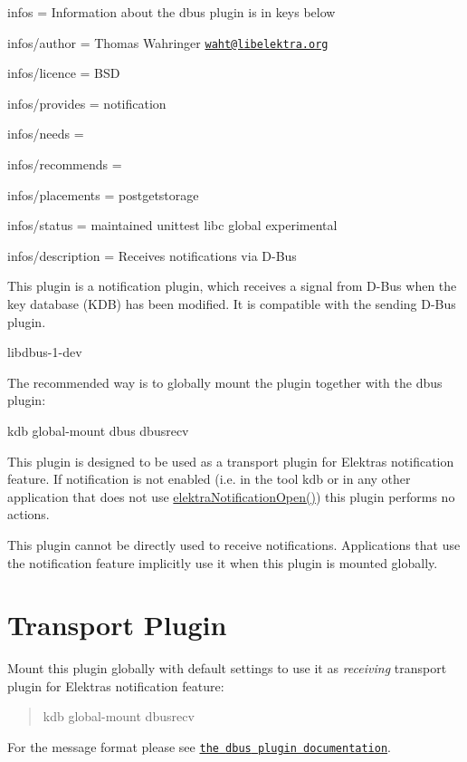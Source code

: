 
\begin{DoxyItemize}
\item infos = Information about the dbus plugin is in keys below
\item infos/author = Thomas Wahringer \href{mailto:waht@libelektra.org}{\tt waht@libelektra.\+org}
\item infos/licence = B\+SD
\item infos/provides = notification
\item infos/needs =
\item infos/recommends =
\item infos/placements = postgetstorage
\item infos/status = maintained unittest libc global experimental
\item infos/description = Receives notifications via D-\/\+Bus
\end{DoxyItemize}

This plugin is a notification plugin, which receives a signal from D-\/\+Bus when the key database (K\+DB) has been modified. It is compatible with the sending D-\/\+Bus plugin.


\begin{DoxyItemize}
\item {\ttfamily libdbus-\/1-\/dev}
\end{DoxyItemize}

The recommended way is to globally mount the plugin together with the dbus plugin\+:


\begin{DoxyCode}
kdb global-mount dbus dbusrecv
\end{DoxyCode}


This plugin is designed to be used as a transport plugin for Elektra\textquotesingle{}s notification feature. If notification is not enabled (i.\+e. in the tool {\ttfamily kdb} or in any other application that does not use {\ttfamily \hyperlink{group__kdbnotification_gaeae96154abdb5fdbf1b34a01e2b23e44}{elektra\+Notification\+Open()}}) this plugin performs no actions.

This plugin cannot be directly used to receive notifications. Applications that use the notification feature implicitly use it when this plugin is mounted globally.\hypertarget{autotoc_md165_autotoc_md168}{}\section{Transport Plugin}\label{autotoc_md165_autotoc_md168}
Mount this plugin globally with default settings to use it as {\itshape receiving} transport plugin for Elektra\textquotesingle{}s notification feature\+:

\begin{quote}
kdb global-\/mount dbusrecv \end{quote}


For the message format please see \href{https://www.libelektra.org/plugins/dbus#notification-format}{\tt the {\ttfamily dbus} plugin documentation}. 